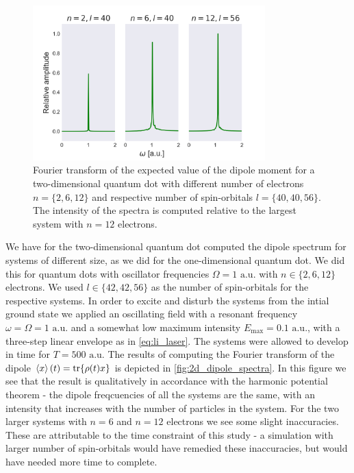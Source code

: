 \begin{figure}
    \centering
    \includegraphics[width=0.8\textwidth]{results/figures/2D/2d_spectrum.png} 
    \caption{Fourier transform of the expected value of the dipole moment for a
        two-dimensional quantum dot with different number of electrons 
        $n=\{2,6,12\}$ and respective number of spin-orbitals 
        $l=\{40,40,56\}$. The intensity of the spectra is computed relative to the 
        largest system with $n=12$ electrons.
    }
    \label{fig:2d_dipole_spectra}
\end{figure}

We have for the two-dimensional quantum dot computed the dipole spectrum for systems of 
different size, as we did for the one-dimensional quantum dot. We did this for 
quantum dots with oscillator frequencies $\Omega=1 \text{ a.u.}$ with $n\in\{2,6,12\}$ electrons.
We used $l\in\{42,42,56\}$ as the number of spin-orbitals for the respective systems.
In order to excite and disturb the systems from the intial ground state we applied 
an oscillating field with a resonant frequency $\omega=\Omega=1 \text{ a.u.}$ and a somewhat low 
maximum intensity $E_\text{max}=0.1 \text{ a.u.}$, with a three-step linear envelope as 
in \autoref{eq:li_laser}. The systems were allowed to develop in time for 
$T = 500 \text{ a.u.}$ The results of computing the Fourier transform of the 
dipole $\ev{x}(t) = \tr{\rho(t) x}$ is depicted in \autoref{fig:2d_dipole_spectra}. 
In this figure we see that the result is qualitatively in accordance with the 
harmonic potential theorem - the dipole freqcuencies of all the systems are the 
same, with an intensity that increases with the number of particles in the system.
For the two larger systems with $n=6$ and $n=12$ electrons we see some slight 
inaccuracies. These are attributable to the time constraint of this study - 
a simulation with larger number of spin-orbitals would have remedied these 
inaccuracies, but would have needed more time to complete.

